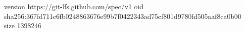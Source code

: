 version https://git-lfs.github.com/spec/v1
oid sha256:367fd711c6fb0248863676e99b7f0422343ad75cf801d9780fd505aaf8ca0b00
size 1398246
